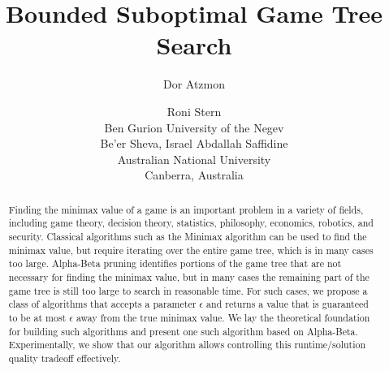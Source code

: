 \documentclass[letterpaper]{article} %
\begin{document}
\title{Bounded Suboptimal Game Tree Search}
\author{Dor Atzmon \and Roni Stern\\
Ben Gurion University of the Negev\\
Be'er Sheva, Israel
\And
Abdallah Saffidine \\
Australian National University\\
Canberra, Australia}

\maketitle

\begin{abstract}
Finding the minimax value of a game is an important problem in a variety of fields, including game theory, decision theory,  statistics, philosophy, economics, robotics, and security. Classical algorithms such as the Minimax algorithm can be used to find the minimax value, but require iterating over the entire game tree, which is in many cases too large. Alpha-Beta pruning identifies portions of the game tree that are not necessary for finding the minimax value, but in many cases the remaining part of the game tree is still too large to search in reasonable time. For such cases, we propose a class of algorithms that accepts a parameter $\epsilon$ and returns a value that is guaranteed to be at most $\epsilon$ away from the true minimax value. We lay the theoretical foundation for building such algorithms and present one such algorithm based on Alpha-Beta. Experimentally, we show that our  algorithm allows controlling this runtime/solution quality tradeoff effectively. %




\end{abstract}
\end{document}
